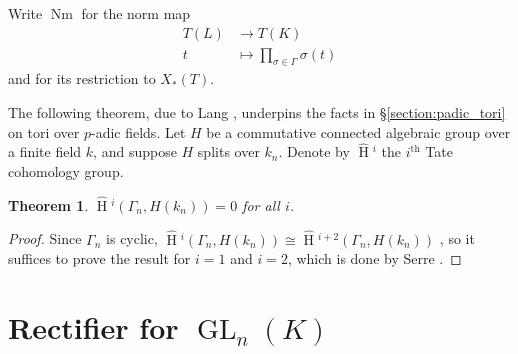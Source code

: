 \documentclass{compositio}
\theoremstyle{plain}
\newtheorem{theorem}{Theorem}[section]
\newcommand{\HT}[1]{\hat{\HH}{}^{#1}}
\theoremstyle{definition}
\DeclareMathOperator{\HH}{H}
\DeclareMathOperator{\Nm}{Nm}
\DeclareMathOperator{\GL}{GL}
\begin{document}
Write $\Nm$ for the norm map
\begin{align*}
T(L) &\rightarrow T(K) \\
t &\mapsto \prod_{\sigma \in \Gamma} \sigma(t)
\end{align*}
and for its restriction to $X_*(T)$.

The following theorem, due to Lang \cite{lang:56a}, underpins the facts in
\S\ref{section:padic_tori} on tori over $p$-adic fields.
Let $H$ be a commutative connected algebraic group over a
finite field $k$, and suppose $H$ splits over $k_n$.  Denote by $\HT{i}$ the $i^{\mathrm{th}}$
Tate cohomology group.

\begin{theorem} \label{thm:lang}
$\HT{i}(\Gamma_n, H(k_n)) = 0$ for all $i$.
\end{theorem}
\begin{proof}
Since $\Gamma_n$ is cyclic,
$\HT{i}(\Gamma_n, H(k_n)) \cong \HT{i+2}(\Gamma_n, H(k_n))$ \cite[Thm. 5]{atiyah-wall:CohomologyGrps},
so it suffices to prove the result for $i=1$ and $i=2$, which is done
by Serre \cite[\S VI.6]{serre:AlgGrpsClassFields}.
\end{proof}

\section{Rectifier for $\GL_{n}(K)$} \label{section:BH_recall}
\end{document}
